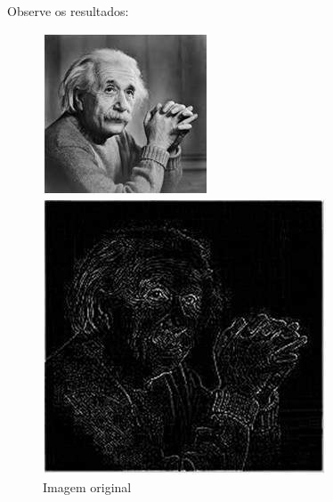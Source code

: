 \documentclass[a4paper, 12pt]{article}
\begin{document}
Observe os resultados:
\begin{figure}[!htb]
	\centering
	  	\includegraphics[width=\linewidth]{images/einstein256.jpg}
	  	\caption{Imagem original}
	\endminipage\hspace{1cm}
		\includegraphics[width=\linewidth]{images/laplacian1.jpg}

\end{figure}
\end{document}
